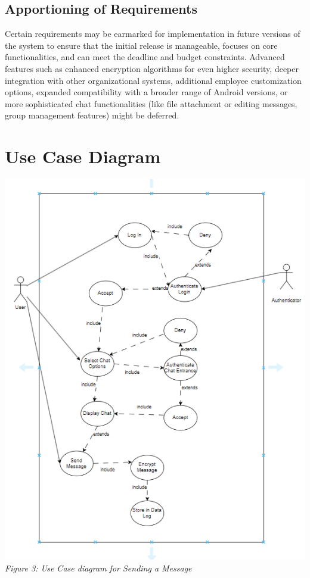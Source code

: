 \documentclass[]{article}
\begin{document}
\subsection{Apportioning of Requirements}
\label{sub:apportioning_of_requirements}
\hspace{5mm}Certain requirements may be earmarked for implementation in future versions of the system to ensure that the initial release is manageable, focuses on core functionalities, and can meet the deadline and budget constraints. Advanced features such as enhanced encryption algorithms for even higher security, deeper integration with other organizational systems, additional employee customization options, expanded compatibility with a broader range of Android versions, or more sophisticated chat functionalities (like file attachment or editing messages, group management features) might be deferred. 

\section{Use Case Diagram}
\label{sec:use_case_diagram}
\begin{center}
    \includegraphics{Graphics/usecaseBetter.png}\\
    \emph{Figure 3: Use Case diagram for Sending a Message}
\end{center}
\end{document}
